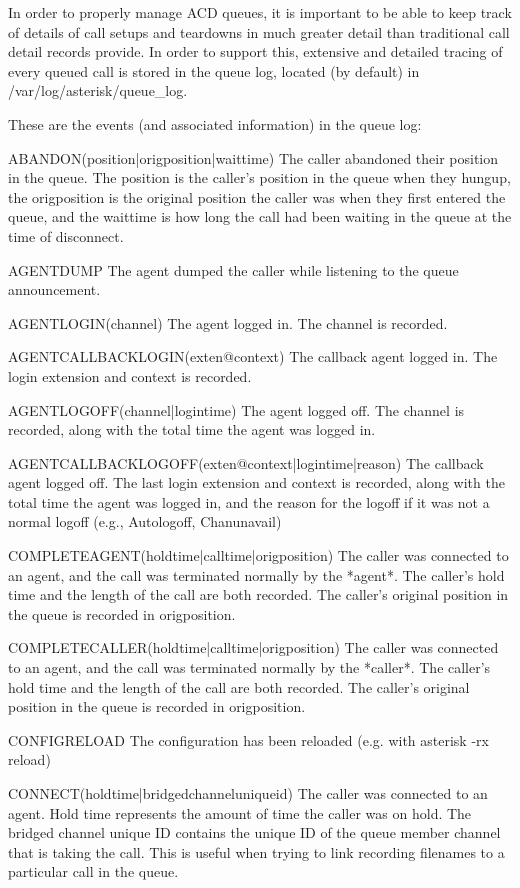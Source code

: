 In order to properly manage ACD queues, it is important to be able to
keep track of details of call setups and teardowns in much greater detail
than traditional call detail records provide.  In order to support this,
extensive and detailed tracing of every queued call is stored in the
queue log, located (by default) in /var/log/asterisk/queue\_log.

These are the events (and associated information) in the queue log:

ABANDON(position|origposition|waittime)
The caller abandoned their position in the queue.  The position is the
caller's position in the queue when they hungup, the origposition is
the original position the caller was when they first entered the
queue, and the waittime is how long the call had been waiting in the 
queue at the time of disconnect.

AGENTDUMP
The agent dumped the caller while listening to the queue announcement.

AGENTLOGIN(channel)
The agent logged in.  The channel is recorded.

AGENTCALLBACKLOGIN(exten@context)
The callback agent logged in.  The login extension and context is recorded.

AGENTLOGOFF(channel|logintime)
The agent logged off.  The channel is recorded, along with the total time
the agent was logged in.

AGENTCALLBACKLOGOFF(exten@context|logintime|reason)
The callback agent logged off.  The last login extension and context is
recorded, along with the total time the agent was logged in, and the
reason for the logoff if it was not a normal logoff 
(e.g., Autologoff, Chanunavail)

COMPLETEAGENT(holdtime|calltime|origposition)
The caller was connected to an agent, and the call was terminated normally
by the *agent*.  The caller's hold time and the length of the call are both
recorded.  The caller's original position in the queue is recorded in
origposition.

COMPLETECALLER(holdtime|calltime|origposition)
The caller was connected to an agent, and the call was terminated normally
by the *caller*.  The caller's hold time and the length of the call are both
recorded.  The caller's original position in the queue is recorded in
origposition.

CONFIGRELOAD
The configuration has been reloaded (e.g. with asterisk -rx reload)

CONNECT(holdtime|bridgedchanneluniqueid)
The caller was connected to an agent.  Hold time represents the amount
of time the caller was on hold. The bridged channel unique ID contains
the unique ID of the queue member channel that is taking the call. This
is useful when trying to link recording filenames to a particular
call in the queue.

